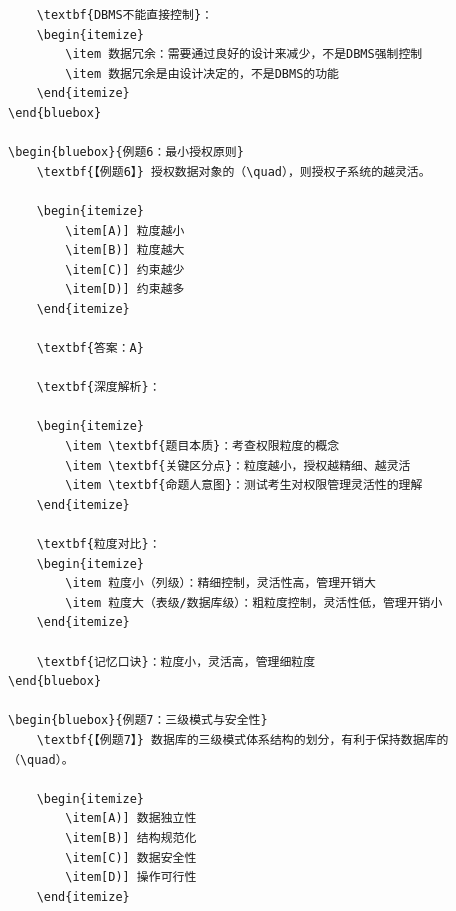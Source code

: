 \documentclass[12pt, a4paper]{article}
\newenvironment{bluebox}[1]{%
  \begin{trivlist}
  \item[\hskip\labelsep \textbf{#1}]
  \setlength{\parskip}{0.5ex}
  \setlength{\itemsep}{0.5ex}
}{%
  \end{trivlist}
}
\begin{document}
\begin{bluebox}{用户管理}
\begin{enumerate}[leftmargin=*, label=\textbf{\arabic*.}]
\begin{verbatim}
	\textbf{DBMS不能直接控制}：
	\begin{itemize}
		\item 数据冗余：需要通过良好的设计来减少，不是DBMS强制控制
		\item 数据冗余是由设计决定的，不是DBMS的功能
	\end{itemize}
\end{bluebox}

\begin{bluebox}{例题6：最小授权原则}
	\textbf{【例题6】} 授权数据对象的（\quad），则授权子系统的越灵活。

	\begin{itemize}
		\item[A)] 粒度越小
		\item[B)] 粒度越大
		\item[C)] 约束越少
		\item[D)] 约束越多
	\end{itemize}

	\textbf{答案：A}

	\textbf{深度解析}：

	\begin{itemize}
		\item \textbf{题目本质}：考查权限粒度的概念
		\item \textbf{关键区分点}：粒度越小，授权越精细、越灵活
		\item \textbf{命题人意图}：测试考生对权限管理灵活性的理解
	\end{itemize}

	\textbf{粒度对比}：
	\begin{itemize}
		\item 粒度小（列级）：精细控制，灵活性高，管理开销大
		\item 粒度大（表级/数据库级）：粗粒度控制，灵活性低，管理开销小
	\end{itemize}

	\textbf{记忆口诀}：粒度小，灵活高，管理细粒度
\end{bluebox}

\begin{bluebox}{例题7：三级模式与安全性}
	\textbf{【例题7】} 数据库的三级模式体系结构的划分，有利于保持数据库的（\quad）。

	\begin{itemize}
		\item[A)] 数据独立性
		\item[B)] 结构规范化
		\item[C)] 数据安全性
		\item[D)] 操作可行性
	\end{itemize}


\end{verbatim}
\end{enumerate}
\end{bluebox}
\end{document}
